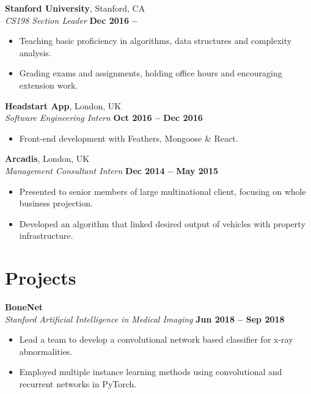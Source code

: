 \documentclass[margin,line]{resume}
\begin{document}
\begin{resume}
    \textbf{Stanford University}, Stanford, CA \vspace{1mm}\\\vspace{1mm}%
    \textsl{CS198 Section Leader} \hfill \textbf{Dec 2016 --}
    \begin{itemize}
        \item Teaching basic proficiency in algorithms, data structures and complexity analysis.
	    \item Grading exams and assignments, holding office hours and encouraging extension work.
    \end{itemize}

    \textbf{Headstart App}, London, UK \vspace{1mm}\\\vspace{1mm}%
    \textsl{Software Engineering Intern} \hfill \textbf{Oct 2016 -- Dec 2016}
    \begin{itemize}
        \item Front-end development with Feathers, Mongoose \& React.
    \end{itemize}

    \textbf{Arcadis}, London, UK \vspace{1mm}\\\vspace{1mm}%
    \textsl{Management Consultant Intern} \hfill \textbf{Dec 2014 -- May 2015}
    \begin{itemize}
        \item Presented to senior members of large multinational client, focusing on whole business projection.
        \item Developed an algorithm that linked desired output of vehicles with property infrastructure.
    \end{itemize}

   \section{\mysidestyle Projects}

    \textbf{BoneNet} \vspace{1mm}\\\vspace{1mm}%
   	\textsl{Stanford Artificial Intelligence in Medical Imaging} \hfill \textbf{Jun 2018 -- Sep 2018}
    \begin{itemize}
        \item Lead a team to develop a convolutional network based classifier for x-ray abnormalities.
        \item Employed multiple instance learning methods using convolutional and recurrent networks in PyTorch.
    \end{itemize}


\end{resume}
\end{document}
